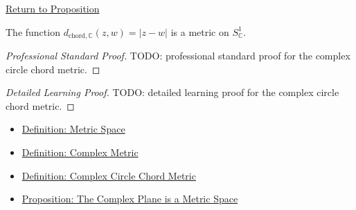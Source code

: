 \newpage
{}
\label{prf:complex-circle-chord-metric}

\begin{remark*}[Return]
\hyperref[prop:complex-circle-chord-metric]{Return to Proposition}
\end{remark*}

\begin{proposition*}
The function \(d_{\mathrm{chord},\mathbb{C}}(z,w)=|z-w|\) is a metric
on \(S^1_{\mathbb{C}}\).
\end{proposition*}

\begin{proof}[Professional Standard Proof]
\LRAProofBodyStart
TODO: professional standard proof for the complex circle chord metric.
\end{proof}

\begin{proof}[Detailed Learning Proof]
\LRAProofBodyStart
TODO: detailed learning proof for the complex circle chord metric.
\end{proof}

\begin{remark*}
\end{remark*}

\begin{dependencies}
\begin{itemize}
  \item \hyperref[def:metric-space]{Definition: Metric Space}
  \item \hyperref[def:complex-metric]{Definition: Complex Metric}
  \item \hyperref[def:complex-circle-chord-metric]{Definition: Complex Circle Chord Metric}
  \item \hyperref[prop:complex-plane-metric-space]{Proposition: The Complex Plane is a Metric Space}
\end{itemize}
\end{dependencies}

\clearpage
